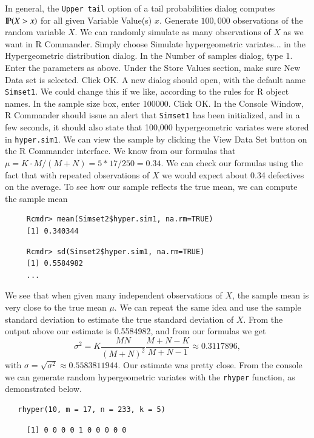 \documentclass[captions=tableheading]{scrbook}
\begin{document}
\begin{example}
   In general, the \texttt{Upper tail} option of a tail probabilities dialog computes \(\P(X>x)\) for all given \textsf{Variable Value(s)} \(x\).
Generate \(100,000\) observations of the random variable \(X\).
   We can randomly simulate as many observations of \(X\) as we want in \textsf{R} Commander. Simply choose \textsf{Simulate hypergeometric variates}... in the \textsf{Hypergeometric distribution} dialog. 
   In the \textsf{Number of samples} dialog, type 1. Enter the parameters as above. Under the \textsf{Store Values} section, make sure \textsf{New Data set} is selected. Click \textsf{OK}. 
   A new dialog should open, with the default name \texttt{Simset1}.  We could change this if we like, according to the rules for \textsf{R} object names. In the sample size box, enter 100000. Click \textsf{OK}. 
   In the Console Window, \textsf{R} Commander should issue an alert that \texttt{Simset1} has been initialized, and in a few seconds, it should also state that 100,000 hypergeometric variates were stored in \texttt{hyper.sim1}. We can view the sample by clicking the \textsf{View Data Set} button on the \textsf{R} Commander interface.
   We know from our formulas that \(\mu=K\cdot M/(M+N)=5*17/250=0.34\). We can check our formulas using the fact that with repeated observations of \(X\) we would expect about 0.34 defectives on the average. To see how our sample reflects the true mean, we can compute the sample mean
\begin{verbatim}
     Rcmdr> mean(Simset2$hyper.sim1, na.rm=TRUE)
     [1] 0.340344
\end{verbatim}
   
\begin{verbatim}
     Rcmdr> sd(Simset2$hyper.sim1, na.rm=TRUE)
     [1] 0.5584982
     ...
\end{verbatim}
   We see that when given many independent observations of \(X\), the sample mean is very close to the true mean \(\mu\). We can repeat the same idea and use the sample standard deviation to estimate the true standard deviation of \(X\). From the output above our estimate is 0.5584982, and from our formulas we get
   \[
   \sigma^{2}=K\frac{MN}{(M+N)^{2}}\frac{M+N-K}{M+N-1}\approx0.3117896,
   \]
   with \(\sigma=\sqrt{\sigma^{2}}\approx0.5583811944\). Our estimate was pretty close.
   From the console we can generate random hypergeometric variates with the \texttt{rhyper} function, as demonstrated below.


\begin{verbatim}
   rhyper(10, m = 17, n = 233, k = 5)
\end{verbatim}

\begin{verbatim}
     [1] 0 0 0 0 1 0 0 0 0 0
\end{verbatim}

\end{example}
\end{document}
